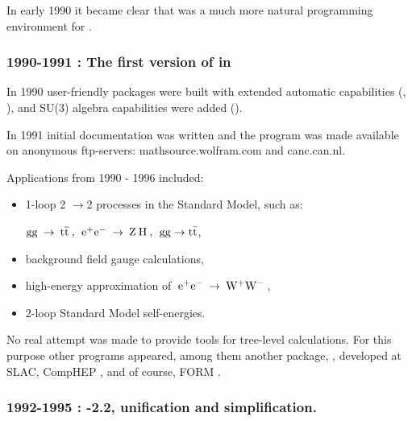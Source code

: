 In early 1990 it became clear that \mma was a much more natural programming environment for \fc.

\subsubsection*{1990-1991 : The first version  of \fc in \mma}

In 1990 user-friendly  packages were built with extended automatic capabilities (,
), and SU(3) algebra capabilities were added ().

In 1991 initial documentation was written and the program was made available on anonymous
ftp-servers: mathsource.wolfram.com and canc.can.nl.

Applications from 1990 - 1996  included:

\begin{itemize}

\item 1-loop 2 \(\rightarrow \)2 processes in the Standard
Model, such as:

\({\rm gg}\> \rightarrow \> 
{\rm t \overline{t}} \> , \> \>
{{\rm e}^+}{{\rm e}^-}\> \rightarrow \> {\rm Z}\> {\rm H}\>, \> \>
{\rm gg} \rightarrow {\rm t\bar{t}} \),

\item background field gauge calculations,

\item high-energy approximation of \(\>{{\rm e}^+}
{{\rm e}^-}\> \rightarrow \> {{\rm W}^+}{{\rm W}^-}\> \),

\item  2-loop Standard Model self-energies.

\end{itemize}

No real attempt was made to provide tools for tree-level calculations.
For this purpose other programs appeared, among them another  \mma package, \hip \cite{yeh}, developed at SLAC, 
CompHEP \cite{Pukhov:1999gg}, and of course, FORM \cite{Vermaseren:2000nd}.

\subsubsection*{1992-1995 : -2.2, unification and simplification.}

